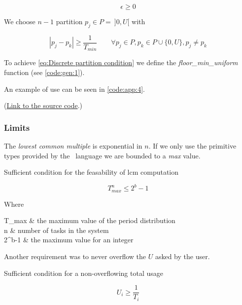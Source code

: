 \documentclass[a4paper,12pt]{article}
\begin{document}
\begin{equation}
	\epsilon \geq 0
	\label{eq:Usage shift polarity}
\end{equation}

We choose $n-1$ partition $p_j \in P = ~]0, U[$ with

\begin{equation}
	|p_j - p_k| \geq \frac{1}{T_{min}} \qquad \forall p_j \in P, p_k \in P \cup \{0, U\}, p_j \neq p_k
	\label{eq:Discrete partition condition}
\end{equation}

To achieve \ref{eq:Discrete partition condition} we define the \emph{floor\_min\_uniform} function (see \ref{code:gen:1}).


An example of use can be seen in \ref{code:app:4}.

(\href{../h/os/generator.h}{Link to the source code}.)

\subsubsection{Limits}

The \emph{lowest common multiple} is exponential in $n$. If we only use the primitive types provided by the \CXX~language we are bounded to a \emph{max} value.

Sufficient condition for the feasability of lcm computation

\begin{equation}
	T_{max}^n \leq 2^b-1
	\label{eq:Lowest common multiple condition}
\end{equation}

Where
\begin{conditions}
	T_{max}		&	the maximum value of the period distribution\\
	n			&	number of tasks in the system \\
	2^b-1		&	the maximum value for an integer
\end{conditions}

Another requirement was to never overflow the $U$ asked by the user.

Sufficient condition for a non-overflowing total usage

\begin{equation}
	U_i \geq \frac{1}{T_i}
	\label{eq:Usage no-overflow warranty}
\end{equation}
\end{document}
